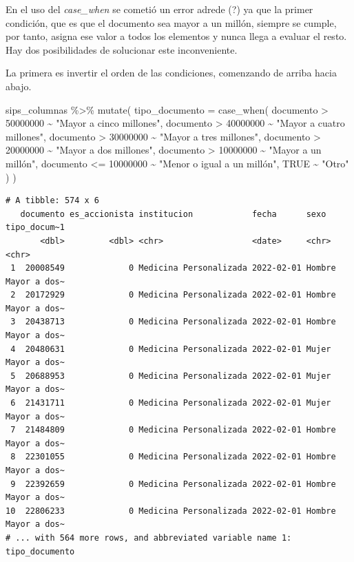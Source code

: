 \documentclass[
  letterpaper,
  DIV=11,
  numbers=noendperiod]{scrreprt}
\newenvironment{Shaded}{\begin{snugshade}}{\end{snugshade}}
\newcommand{\AttributeTok}[1]{\textcolor[rgb]{0.40,0.45,0.13}{#1}}
\newcommand{\ConstantTok}[1]{\textcolor[rgb]{0.56,0.35,0.01}{#1}}
\newcommand{\DecValTok}[1]{\textcolor[rgb]{0.68,0.00,0.00}{#1}}
\newcommand{\FunctionTok}[1]{\textcolor[rgb]{0.28,0.35,0.67}{#1}}
\newcommand{\NormalTok}[1]{\textcolor[rgb]{0.00,0.23,0.31}{#1}}
\newcommand{\SpecialCharTok}[1]{\textcolor[rgb]{0.37,0.37,0.37}{#1}}
\newcommand{\StringTok}[1]{\textcolor[rgb]{0.13,0.47,0.30}{#1}}
\begin{document}
En el uso del \emph{case\_when} se cometió un error adrede (?) ya que la
primer condición, que es que el documento sea mayor a un millón, siempre
se cumple, por tanto, asigna ese valor a todos los elementos y nunca
llega a evaluar el resto. Hay dos posibilidades de solucionar este
inconveniente.

La primera es invertir el orden de las condiciones, comenzando de arriba
hacia abajo.

\begin{Shaded}
\begin{Highlighting}[]
\NormalTok{sips\_columnas }\SpecialCharTok{\%\textgreater{}\%} \FunctionTok{mutate}\NormalTok{(}
  \AttributeTok{tipo\_documento =} \FunctionTok{case\_when}\NormalTok{(}
\NormalTok{    documento }\SpecialCharTok{\textgreater{}} \DecValTok{50000000} \SpecialCharTok{\textasciitilde{}} \StringTok{"Mayor a cinco millones"}\NormalTok{,}
\NormalTok{    documento }\SpecialCharTok{\textgreater{}} \DecValTok{40000000} \SpecialCharTok{\textasciitilde{}} \StringTok{"Mayor a cuatro millones"}\NormalTok{,}
\NormalTok{    documento }\SpecialCharTok{\textgreater{}} \DecValTok{30000000} \SpecialCharTok{\textasciitilde{}} \StringTok{"Mayor a tres millones"}\NormalTok{,}
\NormalTok{    documento }\SpecialCharTok{\textgreater{}} \DecValTok{20000000} \SpecialCharTok{\textasciitilde{}} \StringTok{"Mayor a dos millones"}\NormalTok{,}
\NormalTok{    documento }\SpecialCharTok{\textgreater{}} \DecValTok{10000000} \SpecialCharTok{\textasciitilde{}} \StringTok{"Mayor a un millón"}\NormalTok{,}
\NormalTok{    documento }\SpecialCharTok{\textless{}=} \DecValTok{10000000} \SpecialCharTok{\textasciitilde{}} \StringTok{"Menor o igual a un millón"}\NormalTok{,}
    \ConstantTok{TRUE} \SpecialCharTok{\textasciitilde{}} \StringTok{"Otro"}
\NormalTok{  )}
\NormalTok{)}
\end{Highlighting}
\end{Shaded}

\begin{verbatim}
# A tibble: 574 x 6
   documento es_accionista institucion            fecha      sexo   tipo_docum~1
       <dbl>         <dbl> <chr>                  <date>     <chr>  <chr>       
 1  20008549             0 Medicina Personalizada 2022-02-01 Hombre Mayor a dos~
 2  20172929             0 Medicina Personalizada 2022-02-01 Hombre Mayor a dos~
 3  20438713             0 Medicina Personalizada 2022-02-01 Hombre Mayor a dos~
 4  20480631             0 Medicina Personalizada 2022-02-01 Mujer  Mayor a dos~
 5  20688953             0 Medicina Personalizada 2022-02-01 Mujer  Mayor a dos~
 6  21431711             0 Medicina Personalizada 2022-02-01 Mujer  Mayor a dos~
 7  21484809             0 Medicina Personalizada 2022-02-01 Hombre Mayor a dos~
 8  22301055             0 Medicina Personalizada 2022-02-01 Hombre Mayor a dos~
 9  22392659             0 Medicina Personalizada 2022-02-01 Hombre Mayor a dos~
10  22806233             0 Medicina Personalizada 2022-02-01 Hombre Mayor a dos~
# ... with 564 more rows, and abbreviated variable name 1: tipo_documento
\end{verbatim}
\end{document}
